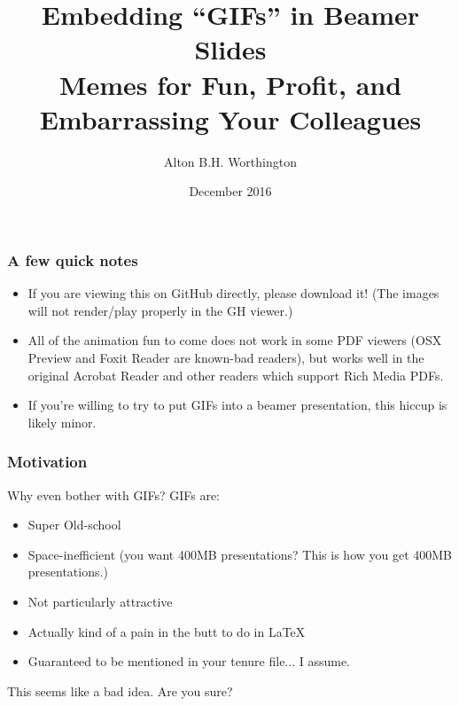 \documentclass{beamer}
\title{Embedding ``GIFs'' in Beamer Slides \\ Memes for Fun, Profit, and Embarrassing Your Colleagues}
\author{Alton B.H. Worthington}
\institute{abhworthington.com}
\date{December 2016}
\begin{document}
\usenavigationsymbolstemplate{}
\frame{\titlepage}

\begin{frame}
	\frametitle{A few quick notes}
	\begin{itemize}
		\item If you are viewing this on GitHub directly, please download it! (The images will not render/play properly in the GH viewer.)
	
		\item All of the animation fun to come does not work in some PDF viewers (OSX Preview and Foxit Reader are known-bad readers), but works well in the original Acrobat Reader and other readers which support Rich Media PDFs.
	
		\item If you're willing to try to put GIFs into a beamer presentation, this hiccup is likely minor.
	\end{itemize}
\end{frame}

\begin{frame}
	\frametitle{Motivation}
	Why even bother with GIFs? GIFs are:
		\begin{itemize}
			\item Super Old-school
			\item Space-inefficient (you want 400MB presentations? This is how you get 400MB presentations.)
			\item Not particularly attractive
			\item Actually kind of a pain in the butt to do in \LaTeX
			\item Guaranteed to be mentioned in your tenure file... I assume.
		\end{itemize}
	This seems like a bad idea. Are you sure?
\end{frame}

\begin{frame}
	\begin{center}
	\end{center}
\end{frame}
\end{document}
